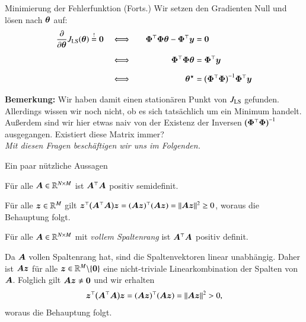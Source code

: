 \begin{frame}{Minimierung der Fehlerfunktion (Forts.)}{}
	Wir setzen den Gradienten Null und lösen nach $\bm{\theta}$ auf:
	\begin{alignat*}{3}
		\frac{\partial}{\partial \bm{\theta}} J_{\text{LS}}(\bm{\theta}) \overset{!}{=} \bm{0}
			&\quad\Longleftrightarrow\quad
			&\bm{\Phi}^\top \bm{\Phi} \bm{\theta} - \bm{\Phi}^\top \bm{y}
			&= \bm{0}
	\\[2mm]
			&\quad\Longleftrightarrow\quad
			&\bm{\Phi}^\top \bm{\Phi} \bm{\theta}
			&= \bm{\Phi}^\top \bm{y}
	\\[2mm]
			&\quad\Longleftrightarrow\quad
			&\bm{\theta}^\star
			&= \bigl( \bm{\Phi}^\top \bm{\Phi} \bigr)^{-1} \bm{\Phi}^\top \bm{y}
	\end{alignat*}

	\begin{boxGray}
		\textbf{Bemerkung:} Wir haben damit einen stationären Punkt von $J_{\text{LS}}$ gefunden. Allerdings wissen wir noch nicht,
		ob es sich tatsächlich um ein Minimum handelt. Außerdem sind wir hier etwas naiv von der Existenz der Inversen
		$\bigl( \bm{\Phi}^\top \bm{\Phi} \bigr)^{-1}$ ausgegangen. Existiert diese Matrix immer? \\
		\textit{Mit diesen Fragen beschäftigen wir uns im Folgenden.}
	\end{boxGray}
\end{frame}


\begin{frame}{Ein paar nützliche Aussagen}{}
	\begin{mytheo}
		Für alle $\bm{A} \in \mathbb{R}^{N \times M}$ ist $\bm{A}^\top \bm{A}$ positiv semidefinit.
	\end{mytheo}
	
	\begin{myproof}
		Für alle $\bm{z} \in \mathbb{R}^M$ gilt
		$\bm{z}^\top \bigl( \bm{A}^\top \bm{A} \bigr) \bm{z} = (\bm{A} \bm{z})^\top (\bm{A} \bm{z}) = \Vert \bm{A} \bm{z} \Vert^2 \ge 0$,
		woraus die Behauptung folgt.	
	\end{myproof}

	\begin{mytheo}
		Für alle $\bm{A} \in \mathbb{R}^{N \times M}$ mit \textit{vollem Spaltenrang} ist $\bm{A}^\top \bm{A}$ positiv definit.
	\end{mytheo}

	\begin{myproof}
		Da $\bm{A}$ vollen Spaltenrang hat, sind die Spaltenvektoren linear unabhängig.
		Daher ist $\bm{A} \bm{z}$ für alle $\bm{z} \in \mathbb{R}^M \backslash \{ \bm{0} \}$ eine nicht-triviale Linearkombination
		der Spalten von $\bm{A}$. Folglich gilt $\bm{A} \bm{z} \ne \bm{0}$ und wir erhalten
		$$\bm{z}^\top \bigl( \bm{A}^\top \bm{A} \bigr) \bm{z} = (\bm{A} \bm{z})^\top (\bm{A} \bm{z}) = \Vert \bm{A} \bm{z} \Vert^2 > 0,$$ woraus die Behauptung folgt.
	\end{myproof}
\end{frame}


